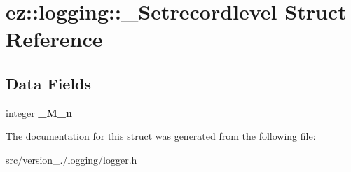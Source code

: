 \hypertarget{structez_1_1logging_1_1__Setrecordlevel}{}\section{ez\+:\+:logging\+:\+:\+\_\+\+Setrecordlevel Struct Reference}
\label{structez_1_1logging_1_1__Setrecordlevel}
\subsection*{Data Fields}
\begin{DoxyCompactItemize}
\item 
\mbox{\label{structez_1_1logging_1_1__Setrecordlevel_a99d4ed18336d6ca971955900596e9799}} 
integer {\bfseries \+\_\+\+M\+\_\+n}
\end{DoxyCompactItemize}


The documentation for this struct was generated from the following file\+:\begin{DoxyCompactItemize}
\item 
src/version\+\_./logging/logger.\+h\end{DoxyCompactItemize}
